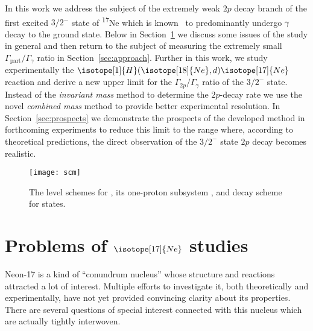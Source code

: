 \documentclass[superscriptaddress,showpacs,showkeys,twoside,floatfix,twocolumn]
{revtex4-1}
\begin{document}
In this work we address the subject of the extremely weak $2p$ decay branch
of the first excited $3/2^-$ state of \textsuperscript{17}Ne
which is known~\cite{Guimaraes:1995a,Guimaraes:1995b}
to predominantly undergo \(\gamma\) decay to the ground state.
Below in Section~\ref{sec:problem} we discuss some issues of the
 study in general and then return to the subject of measuring
the extremely small $\Gamma_{\mathrm{part}} / \Gamma_{\gamma}$ ratio in
Section~\ref{sec:approach}.
Further in this work, we study experimentally the
$\isotope[1]{H}(\isotope[18]{Ne},d)\isotope[17]{Ne}$
reaction and derive a new upper limit for the $\Gamma_{2p}/\Gamma_{\gamma}$
ratio of the $3/2^-$ state.
Instead of the \emph{invariant mass} method to determine the $2p$-decay rate
we use the novel \emph{combined mass} method to provide better experimental resolution.
In Section~\ref{sec:prospects} we demonstrate the prospects of
the developed method in forthcoming experiments to reduce this limit to the range where,
according to theoretical predictions,
the direct observation of the $3/2^-$ state $2p$ decay becomes realistic.

\begin{figure}
\begin{center}
\texttt{[image: scm]}
\end{center}
%
\caption{\label{fig:levels}
  The level schemes for , its one-proton subsystem ,
  and decay scheme for  states.}
%

\end{figure}



\section{Problems of $\isotope[17]{Ne}$ studies}
\label{sec:problem}


Neon-17 is a kind of ``conundrum nucleus''
whose structure and reactions attracted a lot of interest.
Multiple efforts to investigate it, both theoretically and experimentally,
have not yet provided convincing clarity about its properties.
There are several questions of special interest connected with this nucleus
which are actually tightly interwoven.
\end{document}
